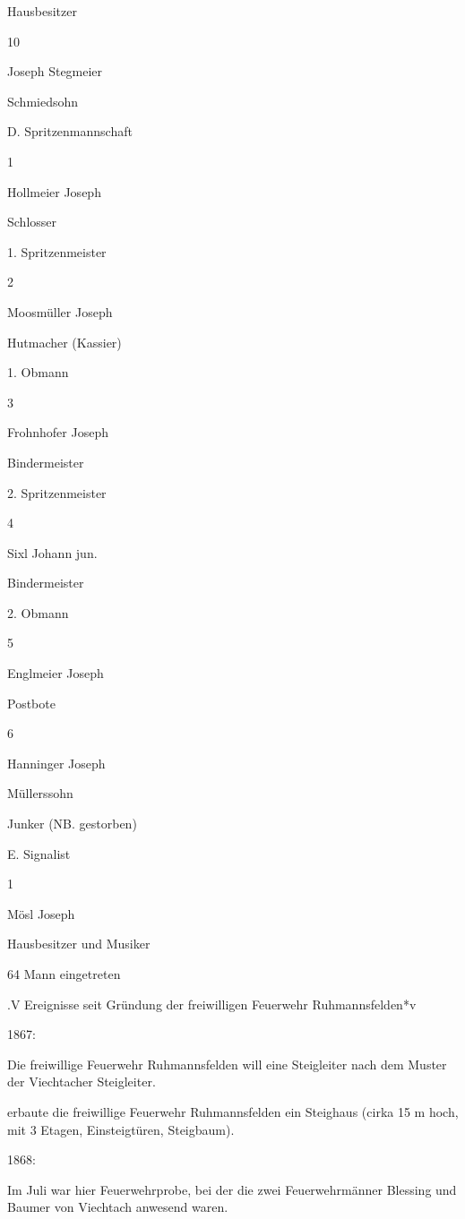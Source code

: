 \documentclass[12pt,a4pager]{book}
\begin{document}
Hausbesitzer



10

Joseph Stegmeier

Schmiedsohn





D. Spritzenmannschaft

1

Hollmeier Joseph

Schlosser

1. Spritzenmeister

2

Moosmüller Joseph

Hutmacher (Kassier)

1. Obmann

3

Frohnhofer Joseph

Bindermeister

2. Spritzenmeister

4

Sixl Johann jun.

Bindermeister

2. Obmann

5

Englmeier Joseph

Postbote



6

Hanninger Joseph

Müllerssohn

Junker (NB. gestorben)



E. Signalist

1

Mösl Joseph

Hausbesitzer und Musiker





64 Mann eingetreten

.V Ereignisse seit Gründung der freiwilligen Feuerwehr Ruhmannsfelden*v

1867:

Die freiwillige Feuerwehr Ruhmannsfelden will eine Steigleiter nach dem Muster
der Viechtacher Steigleiter.

erbaute die freiwillige Feuerwehr Ruhmannsfelden ein Steighaus (cirka 15 m hoch,
mit 3 Etagen, Einsteigtüren, Steigbaum).

1868:

Im Juli war hier Feuerwehrprobe, bei der die zwei Feuerwehrmänner Blessing und
Baumer von Viechtach anwesend waren.
\end{document}
